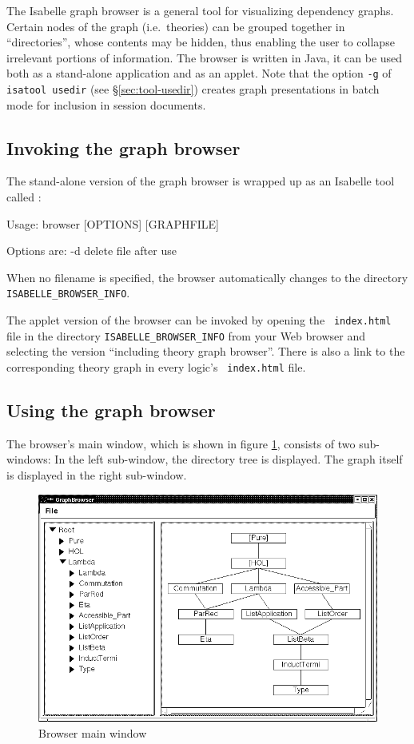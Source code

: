 The Isabelle graph browser is a general tool for visualizing dependency
graphs.  Certain nodes of the graph (i.e.~theories) can be grouped together in
``directories'', whose contents may be hidden, thus enabling the user to
collapse irrelevant portions of information.  The browser is written in Java,
it can be used both as a stand-alone application and as an applet.  Note that
the option \texttt{-g} of \texttt{isatool usedir} (see
\S\ref{sec:tool-usedir}) creates graph presentations in batch mode for
inclusion in session documents.


\subsection{Invoking the graph browser}

The stand-alone version of the graph browser is wrapped up as an
Isabelle tool called :
\begin{ttbox}
Usage: browser [OPTIONS] [GRAPHFILE]

  Options are:
    -d           delete file after use
\end{ttbox}
When no filename is specified, the browser automatically changes to the
directory \texttt{ISABELLE_BROWSER_INFO}.

\medskip The applet version of the browser can be invoked by opening the {\tt
  index.html} file in the directory \texttt{ISABELLE_BROWSER_INFO} from your
Web browser and selecting the version ``including theory graph browser''.
There is also a link to the corresponding theory graph in every logic's {\tt
  index.html} file.


\subsection{Using the graph browser}

The browser's main window, which is shown in figure
\ref{fig:browserwindow}, consists of two sub-windows: In the left
sub-window, the directory tree is displayed. The graph itself is
displayed in the right sub-window.
\begin{figure}[ht]
  \includegraphics[width=\textwidth]{browser_screenshot}
  \caption{\label{fig:browserwindow} Browser main window}
\end{figure}


